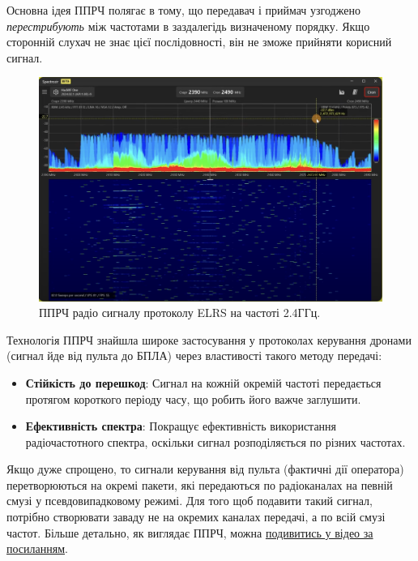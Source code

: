 \documentclass{article}
\begin{document}
Основна ідея ППРЧ полягає в тому, що передавач і приймач узгоджено \textit{перестрибують} між частотами в заздалегідь визначеному порядку. Якщо сторонній слухач не знає цієї послідовності, він не зможе прийняти корисний сигнал.

\begin{figure}[H]
\centering
\includegraphics[width=0.7\linewidth]{images/freq-hope.png}
\caption{\label{fig:hf}ППРЧ радіо сигналу протоколу ELRS на частоті 2.4ГГц.}
\end{figure}

Технологія ППРЧ знайшла широке застосування у протоколах керування дронами (сигнал йде від пульта до БПЛА) через властивості такого методу передачі:
\begin{itemize}[noitemsep, topsep=8pt]
\item \textbf{Стійкість до перешкод}: Сигнал на кожній окремій частоті передається протягом короткого періоду часу, що робить його важче заглушити.
\item \textbf{Ефективність спектра}: Покращує ефективність використання радіочастотного спектра, оскільки сигнал розподіляється по різних частотах.
\end{itemize}

Якщо дуже спрощено, то сигнали керування від пульта (фактичні дії оператора) перетворюються на окремі пакети, які передаються по радіоканалах на певній смузі у псевдовипадковому режимі. Для того щоб подавити такий сигнал, потрібно створювати заваду не на окремих каналах передачі, а по всій смузі частот. Більше детально, як виглядає ППРЧ, можна \href{https://www.youtube.com/watch?v=REyNJcrZHII}{подивитись у відео за посиланням}.
\end{document}
